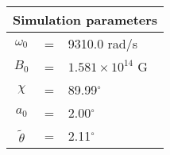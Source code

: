  \begin{tabular}{ccl}
\multicolumn{3}{c}{Simulation parameters} \\
\hline
$\omega_0$  &=& 9310.0 rad/s\\
$B_0$  &=& $ 1.581\times 10^{14} $ G \\
$\chi$  &=& 89.99$^{\circ}$ \\
$a_0$ &=& 2.00$^{\circ}$ \\
$\tilde{\theta}$ &= & 2.11$^{\circ}$
\end{tabular}
    